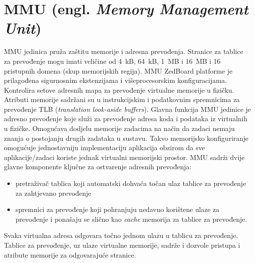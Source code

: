 \documentclass[times, utf8, diplomski, numeric]{fer}
\begin{document}
\section{MMU (engl. \textit{Memory Management Unit})}
MMU jedinica pruža zaštitu memorije i adresna prevođenja. Stranice za tablice za prevođenje mogu imati veličine od 4~kB,
64~kB, 1~MB i 16~MB i 16 pristupnih domena (skup memorijskih regija). MMU ZedBoard platforme je prilagođena sigurnosnim
ekstenzijama i višeprocesorskim konfiguracijama. Kontrolira setove adresnih mapa za prevođenje virtualne memorije u fizičku.
Atributi memorije sadržani su u instrukcijskim i podatkovnim spremnicima za prevođenje TLB (\textit{translation look-aside
buffers}). Glavna funkcija MMU jedinice je adresno prevođenje koje služi za prevođenje adresa koda i podataka iz virtualnih u
fizičke. Omogućava dodjelu memorije zadacima na način da zadaci nemaju znanja o postojanju drugih zadataka u sustavu. Takvo
memorijsko konfiguriranje omogućuje jednostavniju implementaciju aplikacija obzirom da sve aplikacije/zadaci koriste jednak
virtualni memorijski prostor. MMU sadrži dvije glavne komponente ključne za ostvarenje adresnih prevođenja:
\begin{itemize}
  \item{pretraživač tablica koji automatski dohvaća točan ulaz tablice za prevođenje za zahtjevano prevođenje}
  \item{spremnici za prevođenje koji pohranjuju nedavno korištene ulaze za prevođenje i ponašaju se slično kao \textit{cache}
  memorija za tablice za prevođenje.}
\end{itemize}
Svaka virtualna adresa odgovara točno jednom ulazu u tablicu za prevođenje. Tablice za prevođenje, uz ulaze virtualne memorije,
sadrže i dozvole pristupa i atribute memorije za odgovarajuće stranice.
\end{document}
